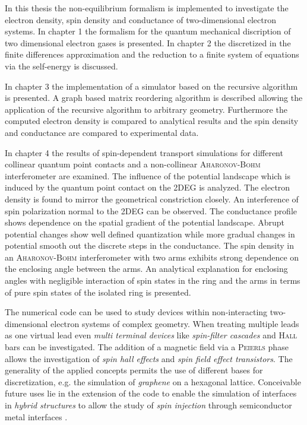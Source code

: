 In this thesis the non-equilibrium \gfnc{} formalism is implemented to investigate the electron density, spin density and conductance of two-dimensional electron systems. In chapter 1 the \gfnc{} formalism for the quantum mechanical discription of two dimensional electron gases is presented. In chapter 2 the discretized \hamil{} in the finite differences approximation and the reduction to a finite system of equations via the self-energy is discussed.\par
In chapter 3 the implementation of a simulator based on the recursive \gfnc{} algorithm is presented. A graph based matrix reordering algorithm is described allowing the application of the recursive \gfnc{} algorithm to arbitrary geometry.
Furthermore the computed electron density is compared to analytical results and the spin density and conductance are compared to experimental data.\par
In chapter 4 the results of spin-dependent transport simulations for different collinear quantum point contacts and a non-collinear \textsc{Aharonov-Bohm} interferometer are examined. The influence of the potential landscape which is induced by the quantum point contact on the 2DEG is analyzed.
The electron density is found to mirror the geometrical constriction closely. An interference of spin polarization normal to the 2DEG can be observed. The conductance profile shows dependence on the spatial gradient of the potential landscape. Abrupt potential changes show well defined quantization while more gradual changes in potential smooth out the discrete steps in the conductance.
The spin density in an \textsc{Aharonov-Bohm} interferometer with two arms exhibits strong dependence on the enclosing angle between the arms. An analytical explanation for enclosing angles with negligible interaction of spin states in the ring and the arms in terms of pure spin states of the isolated ring is presented.\par
The numerical code can be used to study devices within non-interacting two-dimensional electron systems of complex geometry. When treating multiple leads as one virtual lead even \emph{multi terminal devices} like \emph{spin-filter cascades} \cite{jacob:093714} and \textsc{Hall} bars \cite{Wunderlich24122010} can be investigated. The addition of a magnetic field via a \textsc{Peierls} phase allows the investigation of \emph{spin hall effects} and \emph{spin field effect transistors}. The generality of the applied concepts permits the use of different bases for discretization, e.g. the simulation of \emph{graphene} on a hexagonal lattice. Conceivable future uses lie in the extension of the code to enable the simulation of interfaces in \emph{hybrid structures} to allow the study of \emph{spin injection} through semiconductor metal interfaces \cite{holz:431}.
